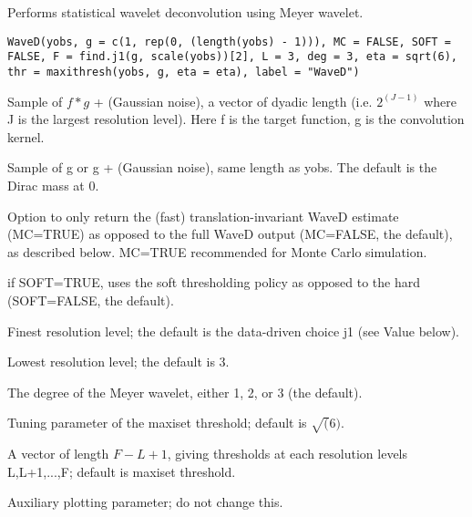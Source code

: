 \begin{Description}\relax
Performs statistical wavelet deconvolution using Meyer wavelet.
\end{Description}
\begin{Usage}
\begin{verbatim}
WaveD(yobs, g = c(1, rep(0, (length(yobs) - 1))), MC = FALSE, SOFT = FALSE, F = find.j1(g, scale(yobs))[2], L = 3, deg = 3, eta = sqrt(6), thr = maxithresh(yobs, g, eta = eta), label = "WaveD")
\end{verbatim}
\end{Usage}
\begin{Arguments}
\begin{ldescription}
\item[\code{yobs}] Sample of $f*g$ + (Gaussian noise), a vector of dyadic length 
(i.e. $2^(J-1)$ where J is the largest resolution level). 
Here f is the target function, g is the convolution kernel.
\item[\code{g}] Sample of g or g + (Gaussian noise), same length as yobs.
The default is the Dirac mass at 0.
\item[\code{MC}] Option to only return the (fast) translation-invariant WaveD estimate
(MC=TRUE) as opposed to the full WaveD output (MC=FALSE, the default), 
as described below. MC=TRUE recommended for Monte Carlo simulation.
\item[\code{SOFT}] if SOFT=TRUE, uses the soft thresholding policy as opposed to the
hard (SOFT=FALSE, the default).
\item[\code{F}] Finest resolution level; the default is the data-driven choice j1
(see Value below).
\item[\code{L}] Lowest resolution level; the default is 3.
\item[\code{deg}] The degree of the Meyer wavelet, either 1, 2, or 3 (the default).
\item[\code{eta}] Tuning parameter of the maxiset threshold; default is $\sqrt(6)$.
\item[\code{thr}] A vector of length $F-L+1$, giving thresholds at each resolution levels L,L+1,...,F; default is maxiset threshold.
\item[\code{label}] Auxiliary plotting parameter; do not change this.
\end{ldescription}
\end{Arguments}
